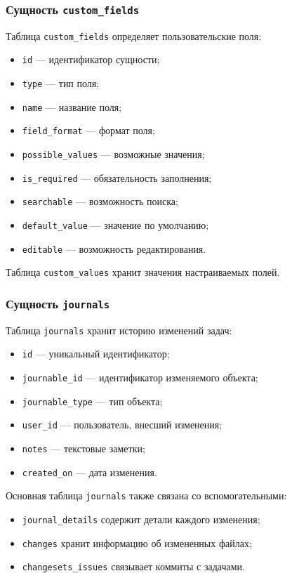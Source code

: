 \subsubsection{Сущность \texttt{custom\_fields}}

Таблица \texttt{custom\_fields} определяет пользовательские поля:

\begin{itemize}
    \item \texttt{id} --- идентификатор сущности;
    \item \texttt{type} --- тип поля;
    \item \texttt{name} --- название поля;
    \item \texttt{field\_format} --- формат поля;
    \item \texttt{possible\_values} --- возможные значения;
    \item \texttt{is\_required} --- обязательность заполнения;
    \item \texttt{searchable} --- возможность поиска;
    \item \texttt{default\_value} --- значение по умолчанию;
    \item \texttt{editable} --- возможность редактирования.
\end{itemize}
Таблица \texttt{custom\_values} хранит значения настраиваемых полей.

\subsubsection{Сущность \texttt{journals}}

Таблица \texttt{journals} хранит историю изменений задач:
\begin{itemize}
    \item \texttt{id} --- уникальный идентификатор;
    \item \texttt{journable\_id} --- идентификатор изменяемого объекта;
    \item \texttt{journable\_type} --- тип объекта;
    \item \texttt{user\_id} --- пользователь, внесший изменения;
    \item \texttt{notes} --- текстовые заметки;
    \item \texttt{created\_on} --- дата изменения.
\end{itemize}

Основная таблица \texttt{journals} также связана со вспомогательными:
\begin{itemize}
    \item \texttt{journal\_details} содержит детали каждого изменения;
    \item \texttt{changes} хранит информацию об измененных файлах;
    \item \texttt{changesets\_issues} связывает коммиты с задачами.
\end{itemize}

